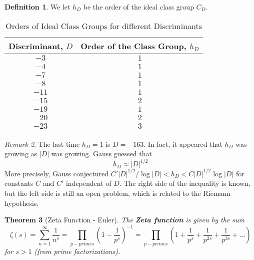 \documentclass[12pt]{article}
\newtheorem{thm}{Theorem}[section]
\theoremstyle{definition}
\newtheorem{defn}[thm]{Definition}
\theoremstyle{remark}
\newtheorem{rmk}[thm]{Remark}
\numberwithin{equation}{section}
\newcommand\B[1]{\textbf{ #1}}
\begin{document}
\vspace{15pt}

\begin{defn}
        We let $h_D$ be the order of the ideal class group $C_D$.
\end{defn}


\vspace{15pt}


\bgroup
\def\arraystretch{1.5}
\begin{table}[H]
        \centering
        \caption{Orders of Ideal Class Groups for different Discriminants}
        \begin{tabular}{c|c}
                Discriminant, $D$ & Order of the Class Group, $h_D$\\ \hline
                $-3$ & $1$\\
                $-4$ & $1$ \\
                $-7$ & $1$ \\
                $-8$ & $1$ \\
                $-11$ & $1$ \\
                $-15$ & $2$ \\
                $-19$ & $1$ \\
                $-20$ & $2$ \\
                $-23$ & $3$ \\
        \end{tabular}
\end{table}
\egroup

\vspace{15pt}

\begin{rmk}
        The last time $h_D = 1$ is $D = -163$. In fact, it appeared that $h_D$ was growing as $|D|$ was growing. Gauss guessed that \begin{equation}
                h_D \approx |D|^{1/2}
        \end{equation}
        More precisely, Gauss conjectured $C'|D|^{1/2}/\log|D| < h_D < C|D|^{1/2}\log|D|$ for constants $C$ and $C'$ independent of $D$. The right side of the inequality is known, but the left side is still an open problem, which is related to the Riemann hypothesis.
\end{rmk}


\vspace{15pt}


\begin{thm}[Zeta Function - Euler]
        The \B{Zeta function} is given by the sum \begin{equation}
                \zeta(s) = \sum\limits_{n=1}^{\infty} \frac{1}{n^s} = \prod\limits_{p-primes}\left(1 - \frac{1}{p^s}\right)^{-1} = \prod\limits_{p-primes}\left(1+\frac{1}{p^s} + \frac{1}{p^{2s}} + \frac{1}{p^{3s}} + \hdots \right)
        \end{equation}
        for $s > 1$ (from prime factorizations).
\end{thm}
\end{document}
